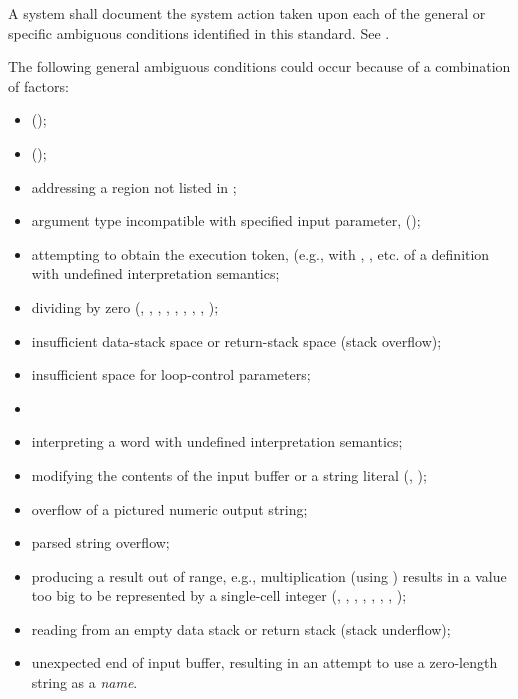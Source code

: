 A system shall document the system action taken upon each of the
general or specific ambiguous conditions identified in this
standard. See .

The following general ambiguous conditions could occur because of a
combination of factors:

\begin{itemize}
\item {} ();
%
\item {}
	();
%
\item addressing a region not listed in ;
%
\item argument type incompatible with specified input parameter,
	();
%
\item attempting to obtain the execution token, (e.g., with
	, , etc. of a definition
	with undefined interpretation semantics;
%
\item dividing by zero
	(,
	 ,
	 ,
	 ,
	 ,
	 ,
	 ,
	 ,
	 );
%
\item insufficient data-stack space or return-stack space (stack
	overflow);
%
\item insufficient space for loop-control parameters;
%
\item {}
%
\item interpreting a word with undefined interpretation semantics;
%
\item modifying the contents of the input buffer or a string literal
	(,
	);
%
\item overflow of a pictured numeric output string;
%
\item parsed string overflow;
%
\item producing a result out of range, e.g., multiplication
	(using \word{*}) results in a value too big to be represented by
	a single-cell integer
	(,
	 ,
	 ,
	 ,
	 ,
	 ,
	 ,
	 );
%
\item reading from an empty data stack or return stack
	(stack underflow);
%
\item unexpected end of input buffer, resulting in an attempt to
	use a zero-length string as a \emph{name}.
\end{itemize}


